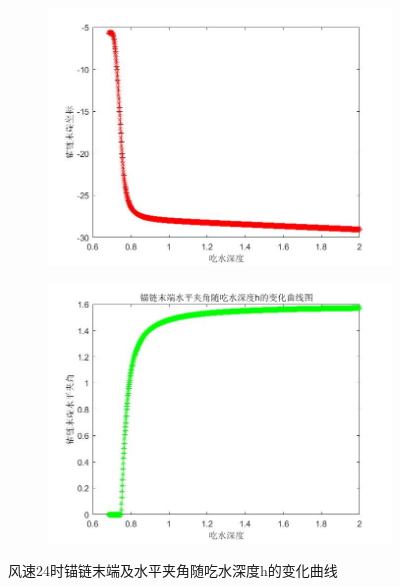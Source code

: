             \begin{figure}[H]
                \centering
                \begin{subfigure}[b]{0.4\textwidth}
                    \includegraphics[width=\textwidth]{images/v_wind_24_yn_h.jpg}
                \end{subfigure}
                \begin{subfigure}[b]{0.4\textwidth}
                    \includegraphics[width=\textwidth]{images/v_wind_24_alpha_h.jpg}
                \end{subfigure}
                \caption{风速24时锚链末端及水平夹角随吃水深度h的变化曲线}
                \label{风速24时锚链末端及水平夹角随吃水深度h的变化曲线}
            \end{figure}
